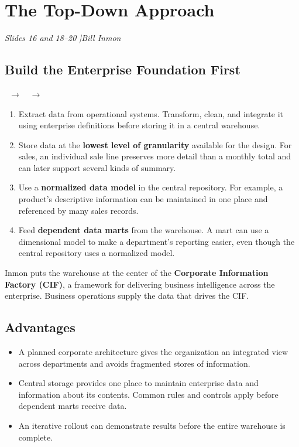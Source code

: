 \documentclass[12pt,a4paper]{article}
\newcommand{\slides}[1]{\textit{\small #1}\par}
\begin{document}
\newpage
\section{The Top-Down Approach}
\slides{Slides 16 and 18--20 \quad|\quad Bill Inmon}
\subsection{Build the Enterprise Foundation First}
\begin{center}\small
{}\ $\longrightarrow$\ \ $\longrightarrow$\ 
\end{center}
\begin{enumerate}
\item Extract data from operational systems. Transform, clean, and integrate it using enterprise definitions before storing it in a central warehouse.
\item Store data at the \textbf{lowest level of granularity} available for the design. For sales, an individual sale line preserves more detail than a monthly total and can later support several kinds of summary.
\item Use a \textbf{normalized data model} in the central repository. For example, a product's descriptive information can be maintained in one place and referenced by many sales records.
\item Feed \textbf{dependent data marts} from the warehouse. A mart can use a dimensional model to make a department's reporting easier, even though the central repository uses a normalized model.
\end{enumerate}
Inmon puts the warehouse at the center of the \textbf{Corporate Information Factory (CIF)}, a framework for delivering business intelligence across the enterprise. Business operations supply the data that drives the CIF.

\subsection{Advantages}
\begin{itemize}
\item A planned corporate architecture gives the organization an integrated view across departments and avoids fragmented stores of information.
\item Central storage provides one place to maintain enterprise data and information about its contents. Common rules and controls apply before dependent marts receive data.
\item An iterative rollout can demonstrate results before the entire warehouse is complete.
\end{itemize}
\end{document}
